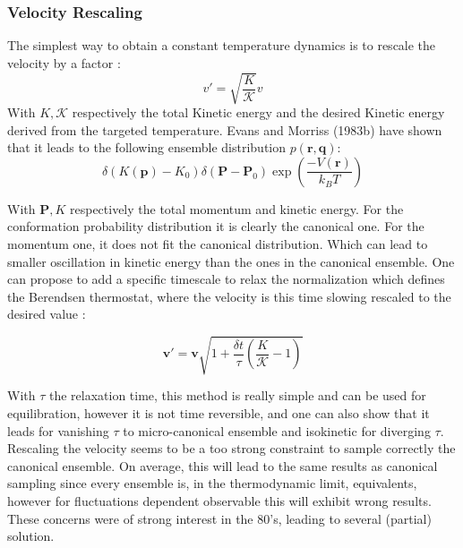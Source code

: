 \documentclass[ansiapaper]{report}
\begin{document}
\begin{multicols}{3}
\subsubsection{Velocity Rescaling}
The simplest way to obtain a constant temperature dynamics is to rescale the velocity by a factor :
\begin{equation}
    v'=\sqrt{\frac{K}{\mathcal{K}}}v 
    \label{eq:velocity_rescaling}
\end{equation}
With $K, \mathcal{K}$ respectively the total Kinetic energy and the desired Kinetic energy derived from the targeted temperature. 
Evans and Morriss (1983b) have shown that it leads to the following ensemble distribution  $p \left( \textbf{r}, \textbf{q} \right) $: 
\begin{equation}
    \label{eq:distribution_velocity_rescaling}
     \delta( K( \textbf{p}) - K_0) \delta( \textbf{P} - \textbf{P}_0 ) \exp \left( \frac{-V(\textbf{r})}{k_B T} \right) 
\end{equation}

With $\textbf{P}, K$ respectively the total momentum and kinetic energy. For the conformation probability distribution it is clearly the canonical one. For the momentum one,  it does not fit the canonical distribution. Which can lead to smaller oscillation in kinetic energy than the ones in the canonical ensemble. One can propose to add a specific timescale to relax the normalization which defines the Berendsen thermostat, where the velocity is this time slowing rescaled to the desired value : 

\begin{equation}
    \textbf{v}' = \textbf{v} \sqrt{1 + \frac{\delta t }{\tau}(\frac{K}{\mathcal{K}} - 1)}
    \label{eq:Berendsen thermostat}
\end{equation}

With $\tau$ the relaxation time, this method is really simple and can be used for equilibration, however it is not time reversible, and one can also show \cite{MD_theo} that it leads for vanishing $\tau$ to micro-canonical ensemble and isokinetic for diverging $\tau$. Rescaling the velocity seems to be a too strong constraint to sample correctly the canonical ensemble. On average, this will lead to the same results as canonical sampling since every ensemble is, in the thermodynamic limit, equivalents, however for fluctuations dependent observable this will exhibit wrong results.  These concerns were of strong interest in the 80's, leading to several (partial) solution. 


\end{multicols}
\end{document}
